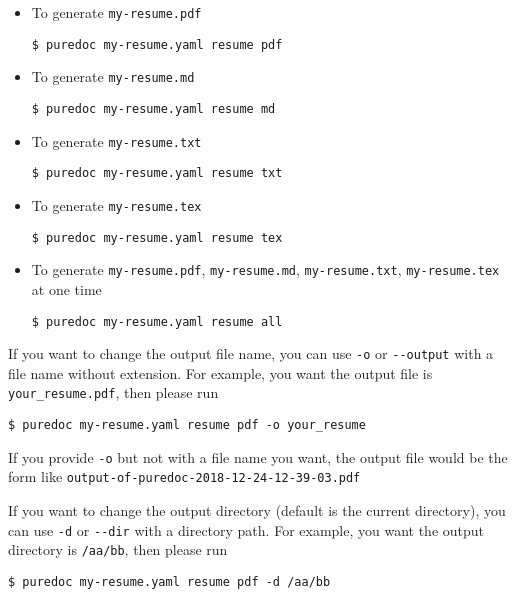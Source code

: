 \documentclass[10pt, a4paper, oneside]{article}
\begin{document}
\begin{itemize}
\item
  To generate \texttt{my-resume.pdf}

\begin{verbatim}
$ puredoc my-resume.yaml resume pdf
\end{verbatim}
\item
  To generate \texttt{my-resume.md}

\begin{verbatim}
$ puredoc my-resume.yaml resume md
\end{verbatim}
\item
  To generate \texttt{my-resume.txt}

\begin{verbatim}
$ puredoc my-resume.yaml resume txt
\end{verbatim}
\item
  To generate \texttt{my-resume.tex}

\begin{verbatim}
$ puredoc my-resume.yaml resume tex
\end{verbatim}
\item
  To generate \texttt{my-resume.pdf}, \texttt{my-resume.md}, \texttt{my-resume.txt}, \texttt{my-resume.tex} at one time

\begin{verbatim}
$ puredoc my-resume.yaml resume all
\end{verbatim}
\end{itemize}

If you want to change the output file name, you can use \texttt{-o} or \texttt{-\/-output} with a file name without extension.
For example, you want the output file is \texttt{your\_resume.pdf}, then please run

\begin{verbatim}
$ puredoc my-resume.yaml resume pdf -o your_resume
\end{verbatim}

If you provide \texttt{-o} but not with a file name you want,
the output file would be the form like \texttt{output-of-puredoc-2018-12-24-12-39-03.pdf}

If you want to change the output directory (default is the current directory), you can use \texttt{-d} or \texttt{-\/-dir} with a directory path.
For example, you want the output directory is \texttt{/aa/bb}, then please run

\begin{verbatim}
$ puredoc my-resume.yaml resume pdf -d /aa/bb
\end{verbatim}
\end{document}
